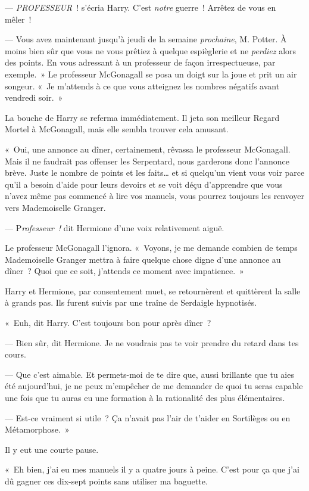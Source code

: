 --- \emph{PROFESSEUR}~! s'écria Harry. C'est \emph{notre} guerre~! Arrêtez de vous en mêler~!

--- Vous avez maintenant jusqu'à jeudi de la semaine \emph{prochaine}, M. Potter. À moins bien sûr que vous ne vous prêtiez à quelque espièglerie et ne \emph{perdiez} alors des points. En vous adressant à un professeur de façon irrespectueuse, par exemple.~» Le professeur McGonagall se posa un doigt sur la joue et prit un air songeur. «~Je m'attends à ce que vous atteignez les nombres négatifs avant vendredi soir.~»

La bouche de Harry se referma immédiatement. Il jeta son meilleur Regard Mortel à McGonagall, mais elle sembla trouver cela amusant.

«~Oui, une annonce au dîner, certainement, rêvassa le professeur McGonagall. Mais il ne faudrait pas offenser les Serpentard, nous garderons donc l'annonce brève. Juste le nombre de points et les faits… et si quelqu'un vient vous voir parce qu'il a besoin d'aide pour leurs devoirs et se voit déçu d'apprendre que vous n'avez même pas commencé à lire vos manuels, vous pourrez toujours les renvoyer vers Mademoiselle Granger.

--- P\emph{rofesseur~!} dit Hermione d'une voix relativement aiguë.

Le professeur McGonagall l'ignora. «~Voyons, je me demande combien de temps Mademoiselle Granger mettra à faire quelque chose digne d'une annonce au dîner~? Quoi que ce soit, j'attends ce moment avec impatience.~»

Harry et Hermione, par consentement muet, se retournèrent et quittèrent la salle à grands pas. Ils furent suivis par une traîne de Serdaigle hypnotisés.

«~Euh, dit Harry. C'est toujours bon pour après dîner~?

--- Bien sûr, dit Hermione. Je ne voudrais pas te voir prendre du retard dans tes cours.

--- Que c'est aimable. Et permets-moi de te dire que, aussi brillante que tu aies été aujourd'hui, je ne peux m'empêcher de me demander de quoi tu seras capable une fois que tu auras eu une formation à la rationalité des plus élémentaires.

--- Est-ce vraiment si utile~? Ça n'avait pas l'air de t'aider en Sortilèges ou en Métamorphose.~»

Il y eut une courte pause.

«~Eh bien, j'ai eu mes manuels il y a quatre jours à peine. C'est pour ça que j'ai dû gagner ces dix-sept points sans utiliser ma baguette.

